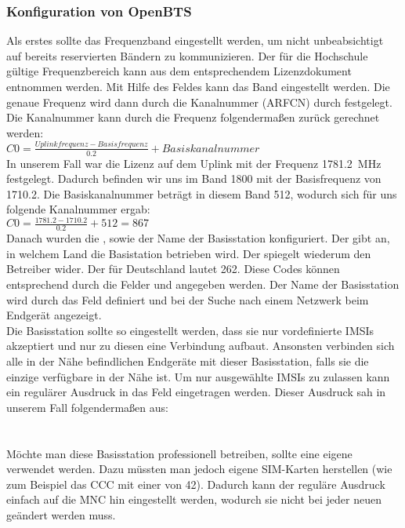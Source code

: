 \subsubsection{Konfiguration von OpenBTS}
Als erstes sollte das Frequenzband eingestellt werden, um nicht unbeabsichtigt auf bereits reservierten Bändern zu kommunizieren.  Der für die Hochschule gültige Frequenzbereich kann aus dem entsprechendem Lizenzdokument entnommen werden. Mit Hilfe des Feldes  kann das Band eingestellt werden. Die genaue Frequenz wird dann durch die Kanalnummer (ARFCN) durch  festgelegt. Die Kanalnummer kann durch die Frequenz folgendermaßen zurück gerechnet werden:\\
$ C0 = \frac{Uplinkfrequenz - Basisfrequenz}{0.2} + Basiskanalnummer $ \\
In unserem Fall war die Lizenz auf dem Uplink mit der Frequenz \SI{1781.2}{\mega\hertz} festgelegt. Dadurch befinden wir uns im Band 1800 mit der Basisfrequenz von 1710.2. Die Basiskanalnummer beträgt in diesem Band 512, wodurch sich für uns folgende Kanalnummer ergab:\\
$ C0 = \frac{1781.2 - 1710.2}{0.2} + 512 = 867 $ \\
Danach wurden die \MCC, \MCC sowie der Name der Basisstation konfiguriert. Der \MCC gibt an, in welchem Land die Basistation betrieben wird. Der \MNC spiegelt wiederum den Betreiber wider. Der \MCC für Deutschland lautet 262. Diese Codes können entsprechend durch die Felder  und  angegeben werden. Der Name der Basisstation wird durch das Feld  definiert und bei der Suche nach einem Netzwerk beim Endgerät angezeigt. \\
Die Basisstation sollte so eingestellt werden, dass sie nur vordefinierte \acp{IMSI} akzeptiert und nur zu diesen eine Verbindung aufbaut. Ansonsten verbinden sich alle in der Nähe befindlichen Endgeräte mit dieser Basisstation, falls sie die einzige verfügbare in der Nähe ist. Um nur ausgewählte \acp{IMSI} zu zulassen kann ein regulärer Ausdruck in das Feld  eingetragen werden. Dieser Ausdruck sah in unserem Fall folgendermaßen aus: \\  \\ 
 \\
Möchte man diese Basisstation professionell betreiben, sollte eine eigene \MNC verwendet werden. Dazu müssten man jedoch eigene SIM-Karten herstellen (wie zum Beispiel das CCC mit einer \MNC von 42). Dadurch kann der reguläre Ausdruck einfach auf die MNC hin eingestellt werden, wodurch sie nicht bei jeder neuen \IMSI geändert werden muss.


